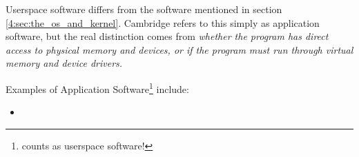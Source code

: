 \documentclass[../main.tex]{subfiles}
\begin{document}
Userspace software differs from the software mentioned in section \ref{4:sec:the_os_and_kernel}. Cambridge refers to this simply as application software, but the real distinction comes from \emph{whether the program has direct access to physical memory and devices, or if the program must run through virtual memory and device drivers.}

Examples of Application Software\footnote{counts as userspace software!} include:

\begin{itemize}
    \item 
\end{itemize}
\end{document}
